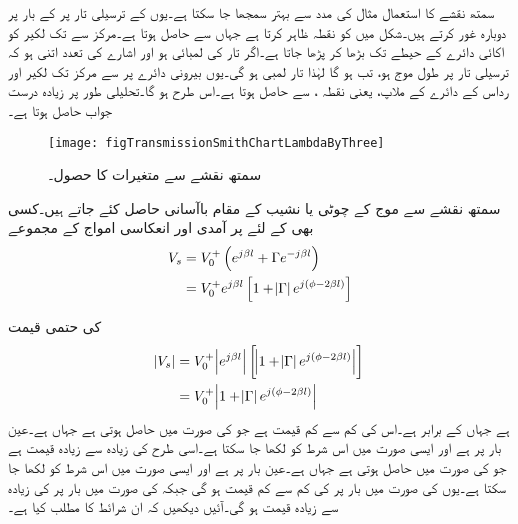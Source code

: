 سمتھ نقشے کا استعمال مثال کی مدد سے بہتر سمجھا جا سکتا ہے۔یوں  کے ترسیلی تار پر  کے بار پر دوبارہ غور کرتے ہیں۔شکل  میں  کو نقطہ  ظاہر کرتا ہے جہاں سے  حاصل ہوتا ہے۔مرکز سے  تک لکیر کو اکائی دائرے کے حیطے تک بڑھا کر  پڑھا جاتا ہے۔اگر تار کی لمبائی  ہو اور اشارے کی تعدد اتنی ہو  کہ ترسیلی تار پر طول موج  ہو، تب  ہو گا لہٰذا تار  لمبی ہو گی۔یوں  بیرونی دائرے پر  سے مرکز تک لکیر  اور  رداس کے دائرے کے ملاپ، یعنی نقطہ ، سے    حاصل ہوتا ہے۔اس طرح  ہو گا۔تحلیلی طور پر زیادہ درست جواب  حاصل ہوتا ہے۔

\begin{figure}
\centering
\texttt{[image: figTransmissionSmithChartLambdaByThree]}
\caption{سمتھ نقشے سے متغیرات کا حصول۔}
\label{شکل_ترسیلی_ایک_تہائی_تار}
\end{figure}

سمتھ نقشے سے موج کے چوٹی یا نشیب کے مقام باآسانی حاصل کئے جاتے ہیں۔کسی بھی  کے لئے  پر آمدی اور انعکاسی امواج کے مجموعے
\begin{align*}
V_s&=V_0^+ \left(e^{j\beta l} +\Gamma e^{-j \beta l}\right)\\
&=V_0^+ e^{j \beta l} \left[1+\abs{\Gamma} e^{j\left(\phi-2 \beta l\right)} \right]
\end{align*}

کی حتمی قیمت
\begin{align*}
\abs{V_s} &=V_0^+ \abs{e^{j\beta l}} \left[\abs{1+\abs{\Gamma} e^{j\left( \phi-2 \beta l\right)} }\right]\\
&=V_0^+\abs{1+\abs{\Gamma} e^{j\left(\phi-2 \beta l\right)} }
\end{align*}
ہے جہاں  کے برابر ہے۔اس کی کم سے کم قیمت  ہے جو  کی صورت میں حاصل ہوتی ہے جہاں  ہے۔عین بار پر  ہے اور ایسی صورت میں اس شرط کو  لکھا جا سکتا ہے۔اسی طرح  کی زیادہ سے زیادہ قیمت  ہے جو  کی صورت میں حاصل ہوتی ہے جہاں  ہے۔عین بار پر  ہے اور ایسی صورت میں اس شرط کو
  لکھا جا سکتا ہے۔یوں  کی صورت میں بار پر  کی کم سے کم قیمت ہو گی جبکہ  کی صورت میں بار پر  کی زیادہ سے زیادہ قیمت ہو گی۔آئیں دیکھیں کہ ان شرائط کا مطلب کیا ہے۔


